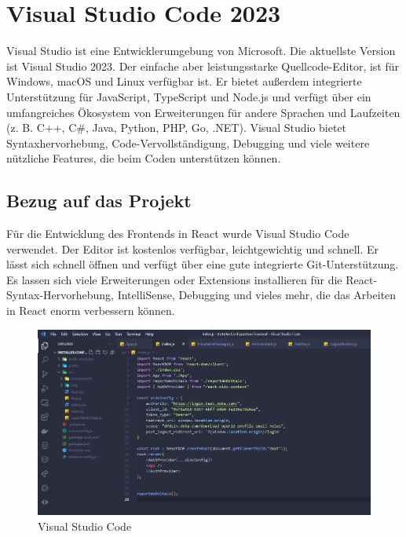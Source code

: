 \section{Visual Studio Code 2023}
Visual Studio ist eine Entwicklerumgebung von Microsoft. Die aktuellste Version ist Visual Studio 2023.
Der einfache aber leistungsstarke Quellcode-Editor, ist für Windows, macOS und Linux verfügbar ist. Er bietet außerdem integrierte Unterstützung für 
JavaScript, TypeScript und Node.js und verfügt über ein umfangreiches Ökosystem von Erweiterungen für andere Sprachen und 
Laufzeiten (z. B. C++, C\#, Java, Python, PHP, Go, .NET).
Visual Studio bietet Syntaxhervorhebung, Code-Vervollständigung, Debugging und viele weitere nützliche Features, die beim 
Coden unterstützen können. \cite{APCW2007}

\subsection*{Bezug auf das Projekt}
Für die Entwicklung des Frontends in React wurde Visual Studio Code verwendet. Der Editor ist kostenlos verfügbar, leichtgewichtig
und schnell. Er lässt sich schnell öffnen und verfügt über eine gute integrierte Git-Unterstützung. Es lassen sich viele 
Erweiterungen oder Extensions installieren für die React-Syntax-Hervorhebung, IntelliSense, Debugging und vieles mehr,
die das Arbeiten in React enorm verbessern können.

\begin{figure}[ht!]
  \centering
  \includegraphics[scale=.4]{pics/visual-studio-code.PNG}
  \caption{\label{fig:The-caption}Visual Studio Code}
  \label{fig:impl:use-case-diagramm}
\end{figure}

